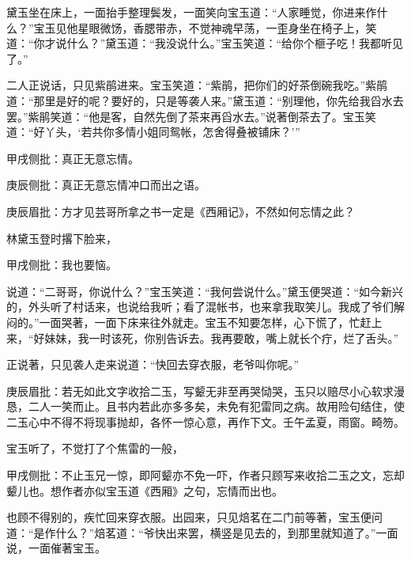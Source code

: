 \begin{parag}


    黛玉坐在床上，一面抬手整理鬓发，一面笑向宝玉道：“人家睡觉，你进来作什么？”宝玉见他星眼微饧，香腮带赤，不觉神魂早荡，一歪身坐在椅子上，笑道：“你才说什么？”黛玉道：“我没说什么。”宝玉笑道：“给你个榧子吃！我都听见了。”
\end{parag}


\begin{parag}


    二人正说话，只见紫鹃进来。宝玉笑道：“紫鹃，把你们的好茶倒碗我吃。”紫鹃道：“那里是好的呢？要好的，只是等袭人来。”黛玉道：“别理他，你先给我舀水去罢。”紫鹃笑道：“他是客，自然先倒了茶来再舀水去。”说著倒茶去了。宝玉笑道：“好丫头，‘若共你多情小姐同鸳帐，怎舍得叠被铺床？’”\begin{note}甲戌侧批：真正无意忘情。\end{note}\begin{note}庚辰侧批：真正无意忘情冲口而出之语。\end{note}\begin{note}庚辰眉批：方才见芸哥所拿之书一定是《西厢记》，不然如何忘情之此？\end{note}林黛玉登时撂下脸来，\begin{note}甲戌侧批：我也要恼。\end{note}说道：“二哥哥，你说什么？”宝玉笑道：“我何尝说什么。”黛玉便哭道：“如今新兴的，外头听了村话来，也说给我听；看了混帐书，也来拿我取笑儿。我成了爷们解闷的。”一面哭著，一面下床来往外就走。宝玉不知要怎样，心下慌了，忙赶上来，“好妹妹，我一时该死，你别告诉去。我再要敢，嘴上就长个疔，烂了舌头。”
\end{parag}


\begin{parag}


    正说著，只见袭人走来说道：“快回去穿衣服，老爷叫你呢。”\begin{note}庚辰眉批：若无如此文字收拾二玉，写颦无非至再哭恸哭，玉只以赔尽小心软求漫恳，二人一笑而止。且书内若此亦多多矣，未免有犯雷同之病。故用险句结住，使二玉心中不得不将现事抛却，各怀一惊心意，再作下文。壬午孟夏，雨窗。畸笏。\end{note}宝玉听了，不觉打了个焦雷的一般，\begin{note}甲戌侧批：不止玉兄一惊，即阿颦亦不免一吓，作者只顾写来收拾二玉之文，忘却颦儿也。想作者亦似宝玉道《西厢》之句，忘情而出也。\end{note}也顾不得别的，疾忙回来穿衣服。出园来，只见焙茗在二门前等著，宝玉便问道：“是作什么？”焙茗道：“爷快出来罢，横竖是见去的，到那里就知道了。”一面说，一面催著宝玉。
\end{parag}


